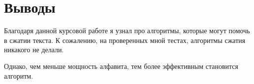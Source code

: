 \section{Выводы}

Благодаря данной курсовой работе я узнал про алгоритмы, которые могут помочь в сжатии текста. К сожалению, на проверенных мной тестах, алгоритмы сжатия никакого не делали.

Однако, чем меньше мощность алфавита, тем более эффективным становится алгоритм.
\pagebreak
